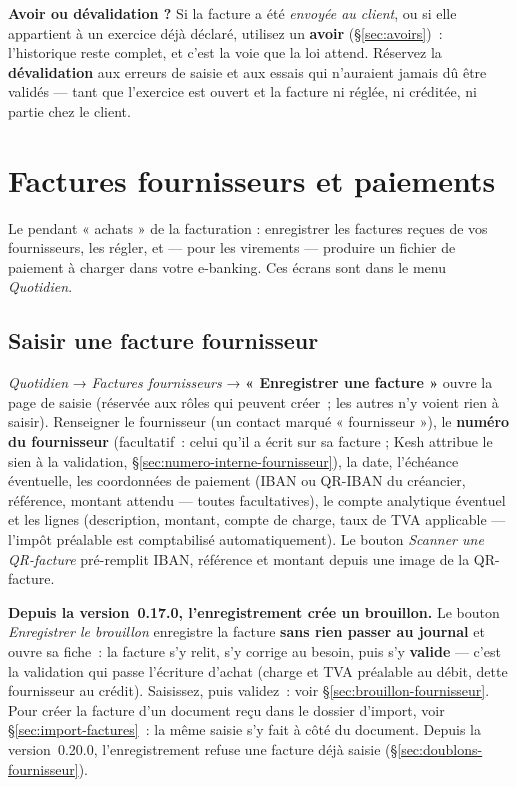 \documentclass[a4paper,11pt,oneside]{article}
\begin{document}
\begin{keshtip}
\textbf{Avoir ou dévalidation ?} Si la facture a été \emph{envoyée au client}, ou si elle appartient
à un exercice déjà déclaré, utilisez un \textbf{avoir} (\S\ref{sec:avoirs})~: l'historique reste
complet, et c'est la voie que la loi attend. Réservez la \textbf{dévalidation} aux erreurs de saisie
et aux essais qui n'auraient jamais dû être validés --- tant que l'exercice est ouvert et la facture
ni réglée, ni créditée, ni partie chez le client.
\end{keshtip}

\section{Factures fournisseurs et paiements}\label{sec:factures-fournisseurs}
\label{sec:fournisseurs}

Le pendant « achats » de la facturation : enregistrer les factures reçues de vos
fournisseurs, les régler, et — pour les virements — produire un fichier de
paiement à charger dans votre e-banking. Ces écrans sont dans le menu
\emph{Quotidien}.

\subsection{Saisir une facture fournisseur}
\label{sec:saisie-facture-fournisseur}

\emph{Quotidien} → \emph{Factures fournisseurs} → \textbf{« Enregistrer une facture »}
ouvre la page de saisie (réservée aux rôles qui peuvent créer~; les autres n'y voient
rien à saisir). Renseigner le fournisseur (un contact marqué « fournisseur »), le \textbf{numéro du
fournisseur} (facultatif~: celui qu'il a écrit sur sa facture ; Kesh attribue le sien à la validation,
\S\ref{sec:numero-interne-fournisseur}), la date,
l'échéance éventuelle, les coordonnées de paiement (IBAN ou QR-IBAN du créancier,
référence, montant attendu --- toutes facultatives), le compte analytique éventuel et les
lignes (description, montant, compte de charge, taux de TVA applicable --- l'impôt
préalable est comptabilisé automatiquement). Le bouton \emph{Scanner une QR-facture}
pré-remplit IBAN, référence et montant depuis une image de la QR-facture.

\textbf{Depuis la version~0.17.0, l'enregistrement crée un brouillon.} Le bouton
\emph{Enregistrer le brouillon} enregistre la facture \textbf{sans rien passer au journal} et
ouvre sa fiche~: la facture s'y relit, s'y corrige au besoin, puis s'y \textbf{valide} ---
c'est la validation qui passe l'écriture d'achat (charge et TVA préalable au débit, dette
fournisseur au crédit). Saisissez, puis validez~: voir \S\ref{sec:brouillon-fournisseur}. Pour
créer la facture d'un document reçu dans le dossier d'import, voir
\S\ref{sec:import-factures}~: la même saisie s'y fait à côté du document. Depuis la
version~0.20.0, l'enregistrement refuse une facture déjà saisie (\S\ref{sec:doublons-fournisseur}).
\end{document}
